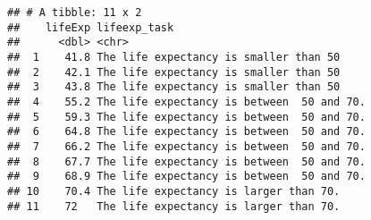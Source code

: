 \documentclass[
]{article}
\newenvironment{Shaded}{\begin{snugshade}}{\end{snugshade}}
\newcommand{\CommentTok}[1]{\textcolor[rgb]{0.56,0.35,0.01}{\textit{#1}}}
\newcommand{\ControlFlowTok}[1]{\textcolor[rgb]{0.13,0.29,0.53}{\textbf{#1}}}
\newcommand{\DecValTok}[1]{\textcolor[rgb]{0.00,0.00,0.81}{#1}}
\newcommand{\KeywordTok}[1]{\textcolor[rgb]{0.13,0.29,0.53}{\textbf{#1}}}
\newcommand{\NormalTok}[1]{#1}
\newcommand{\OperatorTok}[1]{\textcolor[rgb]{0.81,0.36,0.00}{\textbf{#1}}}
\newcommand{\StringTok}[1]{\textcolor[rgb]{0.31,0.60,0.02}{#1}}
\begin{document}
\begin{Shaded}
\end{Shaded}

\begin{verbatim}
## # A tibble: 11 x 2
##    lifeExp lifeexp_task                              
##      <dbl> <chr>                                     
##  1    41.8 The life expectancy is smaller than 50    
##  2    42.1 The life expectancy is smaller than 50    
##  3    43.8 The life expectancy is smaller than 50    
##  4    55.2 The life expectancy is between  50 and 70.
##  5    59.3 The life expectancy is between  50 and 70.
##  6    64.8 The life expectancy is between  50 and 70.
##  7    66.2 The life expectancy is between  50 and 70.
##  8    67.7 The life expectancy is between  50 and 70.
##  9    68.9 The life expectancy is between  50 and 70.
## 10    70.4 The life expectancy is larger than 70.    
## 11    72   The life expectancy is larger than 70.
\end{verbatim}
\end{document}
